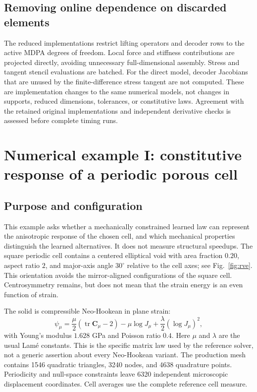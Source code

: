 \documentclass[10pt,a4paper]{article}
\newcommand{\C}{\bm C}
\newcommand{\tr}{\operatorname{tr}}
\begin{document}
\subsection{Removing online dependence on discarded elements}
The reduced implementations restrict lifting operators and decoder rows to the active MDPA degrees of freedom. Local force and stiffness contributions are projected directly, avoiding unnecessary full-dimensional assembly. Stress and tangent stencil evaluations are batched. For the direct model, decoder Jacobians that are unused by the finite-difference stress tangent are not computed. These are implementation changes to the same numerical models, not changes in supports, reduced dimensions, tolerances, or constitutive laws. Agreement with the retained original implementations and independent derivative checks is assessed before complete timing runs.

\section{Numerical example I: constitutive response of a periodic porous cell}
\label{sec:cell}
\subsection{Purpose and configuration}
This example asks whether a mechanically constrained learned law can represent the anisotropic response of the chosen cell, and which mechanical properties distinguish the learned alternatives. It does not measure structural speedups. The square periodic cell contains a centered elliptical void with area fraction $0.20$, aspect ratio $2$, and major-axis angle $30^\circ$ relative to the cell axes; see Fig.~\ref{fig:rve}. This orientation avoids the mirror-aligned configurations of the square cell. Centrosymmetry remains, but does not mean that the strain energy is an even function of strain.

The solid is compressible Neo-Hookean in plane strain:
\begin{equation}
 \psi_\mu=\frac\mu2(\tr\C_\mu-2)-\mu\log J_\mu
              +\frac\lambda2(\log J_\mu)^2,
\end{equation}
with Young's modulus $1.628$ GPa and Poisson ratio $0.4$. Here $\mu$ and $\lambda$ are the usual Lam\'e constants. This is the specific matrix law used by the reference solver, not a generic assertion about every Neo-Hookean variant. The production mesh contains 1546 quadratic triangles, 3240 nodes, and 4638 quadrature points. Periodicity and null-space constraints leave 6320 independent microscopic displacement coordinates. Cell averages use the complete reference cell measure.
\end{document}
